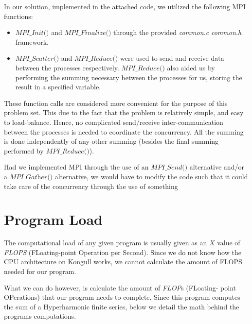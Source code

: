 \documentclass[fontsize=11pt,paper=a4,titlepage]{report}
\begin{document}
In our solution, implemented in the attached code, we utilized the following MPI
functions:

\begin{itemize}
	\item{$\textit{MPI\_Init()}$ and $\textit{
MPI\_Finalize()}$ through the provided \textit{common.c} \textit{common.h}
framework.}
	\item{$\textit{MPI\_Scatter()}$ and $\textit{MPI\_Reduce()}$ were used to
send and receive data between the processes respectively.
$\textit{MPI\_Reduce()}$ also aided us by performing the summing necessary
between the processes for us, storing the result in a specified variable.}
\end{itemize}

These function calls are considered more convenient for the purpose of this
problem set. This due to the fact that the problem is relatively simple, and
easy to load-balance. Hence, no complicated send/receive inter-communication
between the processes is needed to coordinate the concurrency. All the summing
is done independently of any other summing (besides the final summing performed
by $\textit{MPI\_Reduce()}$).

Had we implemented MPI through the use of an $\textit{MPI\_Send()}$ alternative
and/or a $\textit{MPI\_Gather()}$ alternative, we would have to modify the code
such that it could take care of the concurrency through the use of something




\section{Program Load}

The computational load of any given program is usually given as an $X$ value of
\textit{FLOPS} (FLoating-point Operation per Second). Since we do not know how
the CPU architecture on Kongull works, we cannot calculate the amount of FLOPS
needed for our program.

What we can do however, is calculate the amount of \textit{FLOP}s (FLoating-
point OPerations) that our program needs to complete. Since this program
computes the sum of a Hyperharmonic finite series, below we detail the math
behind the programs computations.
\end{document}
